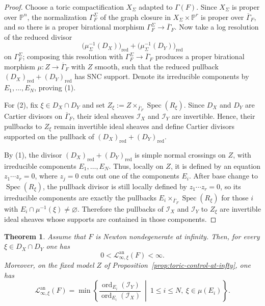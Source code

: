 \documentclass[12pt]{amsart}
\newcommand{\PP}{\mathbb{P}}
\newcommand{\ord}{\operatorname{\mathrm{ord}}}
\newcommand{\Loj}{\mathcal{L}} %
\DeclareMathOperator{\Spec}{Spec}
\theoremstyle{plain}
\newtheorem{theorem}{Theorem}[section]
\theoremstyle{definition}
\numberwithin{equation}{section}
\begin{document}
\begin{proof}
	Choose a toric compactification $X_\Sigma$ adapted to $\Gamma(F)$.
	Since $X_\Sigma$ is proper over $\PP^n$, the normalization $\Gamma_F^\Sigma$ of the graph closure in
	$X_\Sigma\times \PP^r$ is proper over $\overline{\Gamma}_F$, and so there is a proper birational morphism
	$\Gamma_F^\Sigma\to \overline{\Gamma}_F$.
	Now take a log resolution of the reduced divisor
	\[
	\bigl(\mu_\Sigma^{-1}(D_X)\bigr)_\text{red} + \bigl(\mu_\Sigma^{-1}(D_Y)\bigr)_\text{red}
	\]
	on $\Gamma_F^\Sigma$; composing this resolution with $\Gamma_F^\Sigma\to\overline{\Gamma}_F$ produces
	a proper birational morphism $\mu:Z \to\overline{\Gamma}_F$ with $Z$ smooth, such that the reduced pullback
	$(D_X)_\text{red}+(D_Y)_\text{red}$ has SNC support. Denote its irreducible components by $E_1,\dots,E_N$, proving (1).
	
For (2), fix $\xi\in D_X\cap D_Y$ and set
$Z_\xi:=Z\times_{\overline{\Gamma}_F}\Spec(R_\xi)$.
Since $D_X$ and $D_Y$ are Cartier divisors on $\overline{\Gamma}_F$,
their ideal sheaves $\mathscr I_X$ and $\mathscr I_Y$ are invertible.
Hence, their pullbacks to $Z_\xi$ remain invertible ideal sheaves and define
Cartier divisors supported on the pullback of
$(D_X)_{\mathrm{red}}+(D_Y)_{\mathrm{red}}$.

By (1), the divisor $(D_X)_{\mathrm{red}}+(D_Y)_{\mathrm{red}}$ is simple normal
crossings on $Z$, with irreducible components $E_1,\dots,E_N$.
Thus, locally on $Z$, it is defined by an equation $z_1\cdots z_r=0$, where
$z_j=0$ cuts out one of the components $E_i$. After base change to
$\Spec(R_\xi)$, the pullback divisor is still locally defined by
$z_1\cdots z_r=0$, so its irreducible components are exactly the pullbacks
$E_i\times_{\overline{\Gamma}_F}\Spec(R_\xi)$ for those $i$ with
$E_i\cap \mu^{-1}(\xi)\neq\varnothing$. Therefore the pullbacks of
$\mathscr I_X$ and $\mathscr I_Y$ to $Z_\xi$ are invertible ideal sheaves
whose supports are contained in those components.
\end{proof}

\begin{theorem}\label{thm:newton-finite-infty}
	Assume that $F$ is Newton nondegenerate at infinity. Then, for every $\xi\in D_X\cap D_Y$ one has
	\[
	0<\Loj^{\text{an}}_{\infty,\xi}(F)<\infty.
	\]
	Moreover, on the fixed model $Z$ of Proposition~\ref{prop:toric-control-at-infty}, one has
	\[
	\Loj^{\text{an}}_{\infty,\xi}(F)
	=
	\min\left\{
	\frac{\ord_{E_i}(\mathscr I_Y)}{\ord_{E_i}(\mathscr I_X)}
	\ \middle|\
	1\le i\le N,\ \xi\in \mu(E_i)
	\right\}.
	\]
\end{theorem}
\end{document}
